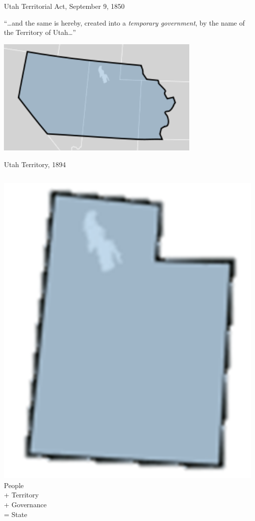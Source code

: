 \begin{frame}{Utah Territorial Act, September 9, 1850}
    \centering
    \begin{block}{}
        ``\ldots and the same is hereby, created into a \emph{temporary government}, by the name of the Territory of Utah\ldots''
    \end{block}
    \vspace{10pt}
    \includegraphics[width=0.75\textwidth]{img/utah-terr.png} \\
\end{frame}

\begin{frame}{Utah Territory, 1894}
    \begin{columns}[onlytextwidth]
            \centering
            \includegraphics[height=0.75\textheight]{img/utah-state.png} \\

            \Huge{People \\ + Territory \\ + Governance \\ = State}
    \end{columns}
\end{frame}

